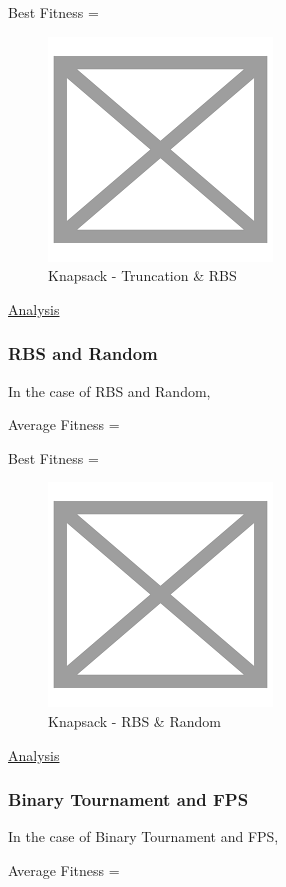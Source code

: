 \documentclass[11pt, letterpaper]{article}
\begin{document}
Best Fitness = 
\begin{figure}[H]
    \centering
    \includegraphics[scale = 0.6]{images/placeHolder.png}
    \caption {Knapsack - Truncation \& RBS}
    \label {fig:kpTR}
\end{figure}

\underline{Analysis}
\subsubsection {RBS and Random}
In the case of RBS and Random,

Average Fitness = 

Best Fitness = 
\begin{figure}[H]
    \centering
    \includegraphics[scale = 0.6]{images/placeHolder.png}
    \caption {Knapsack - RBS \& Random}
    \label {fig:kpRbR}
\end{figure}

\underline{Analysis}
\subsubsection {Binary Tournament and FPS}
In the case of Binary Tournament and FPS,

Average Fitness = 
\end{document}
